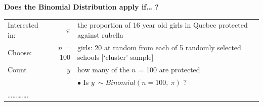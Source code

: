 \documentclass[]{book}
\begin{document}
\textbf{Does the Binomial Distribution apply if\ldots{} ?}

\begin{longtable}[]{@{}lrl@{}}
\toprule
\endhead
\begin{minipage}[t]{0.60\columnwidth}\raggedright
Interested in:\strut
\end{minipage} & \begin{minipage}[t]{0.16\columnwidth}\raggedleft
\(\pi\)\strut
\end{minipage} & \begin{minipage}[t]{0.16\columnwidth}\raggedright
the proportion of 16 year old girls in Quebec protected against rubella\strut
\end{minipage}\tabularnewline
\begin{minipage}[t]{0.60\columnwidth}\raggedright
Choose:\strut
\end{minipage} & \begin{minipage}[t]{0.16\columnwidth}\raggedleft
\(n\) = 100\strut
\end{minipage} & \begin{minipage}[t]{0.16\columnwidth}\raggedright
girls: 20 at random from each of 5 randomly selected schools {[}`cluster' sample{]}\strut
\end{minipage}\tabularnewline
\begin{minipage}[t]{0.60\columnwidth}\raggedright
Count\strut
\end{minipage} & \begin{minipage}[t]{0.16\columnwidth}\raggedleft
\(y\)\strut
\end{minipage} & \begin{minipage}[t]{0.16\columnwidth}\raggedright
how many of the \(n\) = 100 are protected\strut
\end{minipage}\tabularnewline
\begin{minipage}[t]{0.60\columnwidth}\raggedright
\strut
\end{minipage} & \begin{minipage}[t]{0.16\columnwidth}\raggedleft
\strut
\end{minipage} & \begin{minipage}[t]{0.16\columnwidth}\raggedright
\(\bullet\) Is \(y ~ \sim Binomial(n=100, \ \pi)\) ?\strut
\end{minipage}\tabularnewline
\begin{minipage}[t]{0.60\columnwidth}\raggedright
\ldots{}\ldots{}\ldots{}\ldots{}.\strut
\end{minipage} & \begin{minipage}[t]{0.16\columnwidth}\raggedleft

\end{minipage}
\end{longtable}
\end{document}
